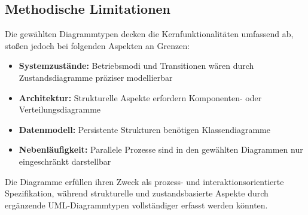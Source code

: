\documentclass[12pt,oneside]{article}
\begin{document}
\subsection{Methodische Limitationen}
Die gewählten Diagrammtypen decken die Kernfunktionalitäten umfassend ab, stoßen jedoch bei folgenden Aspekten an Grenzen:
\begin{itemize}
\item \textbf{Systemzustände:} Betriebsmodi und Transitionen wären durch Zustandsdiagramme präziser modellierbar
\item \textbf{Architektur:} Strukturelle Aspekte erfordern Komponenten- oder Verteilungsdiagramme
\item \textbf{Datenmodell:} Persistente Strukturen benötigen Klassendiagramme
\item \textbf{Nebenläufigkeit:} Parallele Prozesse sind in den gewählten Diagrammen nur eingeschränkt darstellbar
\end{itemize}
\noindent
Die Diagramme erfüllen ihren Zweck als prozess- und interaktionsorientierte Spezifikation, während strukturelle und zustandsbasierte Aspekte durch ergänzende UML-Diagrammtypen vollständiger erfasst werden könnten.
\end{document}
